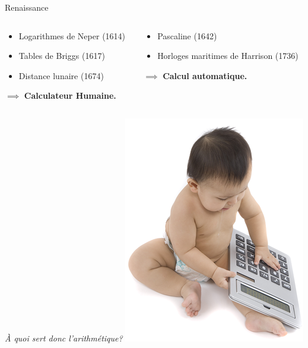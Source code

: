 \begin{frame}{Renaissance}
\begin{columns}
\begin{column}{0.40\linewidth}
	\end{column}
\end{columns}
\begin{columns}
	\begin{column}{0.49\linewidth}
		\begin{itemize}
			\item Logarithmes de Neper (1614)
			\item Tables de Briggs (1617)
			\item Distance lunaire (1674)
		\end{itemize}
		$\implies$ \textbf{Calculateur Humaine.}
	\end{column}
	\begin{column}{0.49\linewidth}
		\begin{itemize}
			\item Pascaline (1642)
			\item Horloges maritimes de Harrison (1736)
		\end{itemize}
		$\implies$ \textbf{Calcul automatique.}
	\end{column}
\end{columns}
\end{frame}
\begin{frame}
\centering
\huge \emph{À quoi sert donc l'arithmétique?}
\vfill
\centering
\includegraphics[height=0.5\paperheight]{../resources/illustrations/calculator_baby} \\
\vfill
\end{frame}
